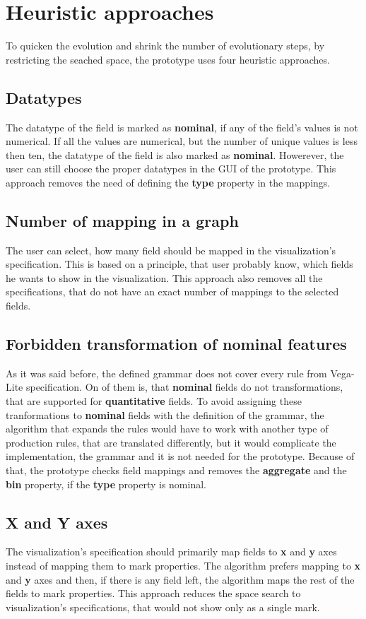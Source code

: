 \section{Heuristic approaches}
  To quicken the evolution and shrink the number of evolutionary steps, by restricting the seached space, the prototype uses four heuristic approaches.
  \subsection{Datatypes}
  The datatype of the field is marked as \textbf{nominal}, if any of the field's values is not numerical. If all the values are numerical, but the number of unique values is less then ten, the datatype of the field is also marked as \textbf{nominal}. Howerever, the user can still choose the proper datatypes in the GUI of the prototype. This approach removes the need of defining the \textbf{type} property in the mappings.
  \subsection{Number of mapping in a graph}
  The user can select, how many field should be mapped in the visualization's specification. This is based on a principle, that user probably know, which fields he wants to show in the visualization. This approach also removes all the specifications, that do not have an exact number of mappings to the selected fields.
  \subsection{Forbidden transformation of nominal features}
  As it was said before, the defined grammar does not cover every rule from Vega-Lite specification. On of them is, that \textbf{nominal} fields do not transformations, that are supported for \textbf{quantitative} fields. To avoid assigning these tranformations to \textbf{nominal} fields with the definition of the grammar, the algorithm that expands the rules would have to work with another type of production rules, that are translated differently, but it would complicate the implementation, the grammar and it is not needed for the prototype. Because of that, the prototype checks field mappings and removes the \textbf{aggregate} and the \textbf{bin} property, if the \textbf{type} property is nominal.
  \subsection{X and Y axes}
  The visualization's specification should primarily map fields to \textbf{x} and \textbf{y} axes instead of mapping them to mark properties. The algorithm prefers mapping to \textbf{x} and \textbf{y} axes and then, if there is any field left, the algorithm maps the rest of the fields to mark properties. This approach reduces the space search to visualization's specifications, that would not show only as a single mark.

